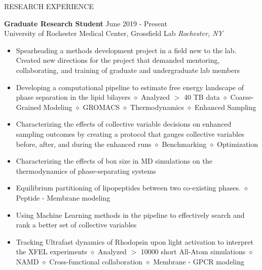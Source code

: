 \documentclass{resume} %
\begin{document}

\begin{rSection}{RESEARCH EXPERIENCE}

   \textbf{Graduate Research Student} \hfill June 2019 - Present\\
   University of Rochester Medical Center, Grossfield Lab \hfill \textit{Rochester, NY}
   \begin{itemize}
      \itemsep -3pt {}
      \item Spearheading a methods development project in a field new to the lab. Created new directions for the project that demanded mentoring, collaborating, and training of graduate and undergraduate lab members
      \item Developing a computational pipeline to estimate free energy landscape of phase separation in the lipid bilayers $\diamond$ Analyzed $>$ 40 TB data
            $\diamond$ Coarse-Grained Modeling $\diamond$ GROMACS  $\diamond$ Thermodynamics $\diamond$ Enhanced Sampling
      \item Characterizing the effects of collective variable decisions on enhanced sampling outcomes by creating a protocol that gauges collective variables before, after, and during the enhanced runs
            $\diamond$ Benchmarking $\diamond$ Optimization
      \item Characterizing the effects of box size in MD simulations on the thermodynamics of phase-separating systems
      \item Equilibrium partitioning of lipopeptides between two co-existing phases. $\diamond$ Peptide - Membrane modeling
      \item Using Machine Learning methods in the pipeline to effectively search and rank a better set of collective variables
      \item Tracking Ultrafast dynamics of Rhodopsin upon light activation to interpret the XFEL experiments $\diamond$ Analyzed $>$ 10000 short All-Atom simulations
            $\diamond$ NAMD $\diamond$ Cross-functional collaboration $\diamond$  Membrane - GPCR modeling
   \end{itemize}


\end{rSection}
\end{document}
